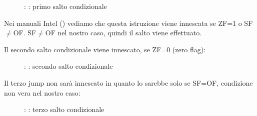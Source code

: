 \begin{figure}[H]
\centering
{}
\caption{\olly: : primo salto condizionale}
\label{fig:jcc_olly_signed_1}
\end{figure}

Nei manuali Intel () vediamo che questa istruzione viene innescata se ZF=1 o SF$\neq$OF.
SF$\neq$OF nel nostro caso, quindi il salto viene effettuato.

\clearpage
Il secondo salto condizionale \JNZ viene innescato, se ZF=0 (zero flag):

\begin{figure}[H]
\centering
{}
\caption{\olly: : secondo salto condizionale}
\label{fig:jcc_olly_signed_2}
\end{figure}

\clearpage
Il terzo jump \JGE non sarà innescato in quanto lo sarebbe solo se SF=OF, condizione non vera nel nostro caso:

\begin{figure}[H]
\centering
{}
\caption{\olly: : terzo salto condizionale}
\label{fig:jcc_olly_signed_3}
\end{figure}

